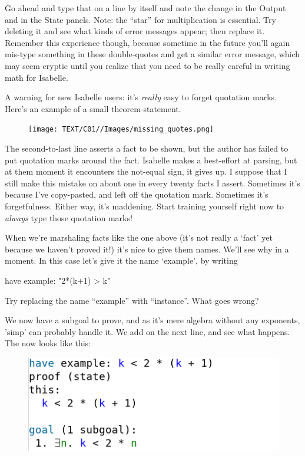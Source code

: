 \task Go ahead and type that on a line by itself and note the change in the Output and in the State panels. Note: the ``star'' for multiplication is essential. Try deleting it and see what kinds of error messages appear; then replace it. Remember this experience though, because sometime in the future you'll again mis-type something in these double-quotes and get a similar error message, which may seem cryptic until you realize that you need to be really careful in writing math for Isabelle.
\etask

A warning for new Isabelle users: it's \textit{really} easy to forget quotation marks. Here's an example of a small theorem-statement. 
\begin{figure}[h]
    \texttt{[image: TEXT/C01//Images/missing\_quotes.png]}
\end{figure}
The second-to-last line asserts a fact to be shown, but the author has failed to put quotation marks around the fact. Isabelle makes a best-effort at parsing, but at them moment it encounters the not-equal sign, it gives up. I suppose that I still make this mistake on about one in every twenty facts I assert. Sometimes it's because I've copy-pasted, and left off the quotation mark. Sometimes it's forgetfulness. Either way, it's maddening. Start training yourself right now to \textit{always} type those quotation marks!

When we're marshaling facts like the one above (it's not really a `fact' yet because we haven't proved it!) it's nice to give them names. We'll see why in a moment. In this case let's give it the name `example', by writing
\begin{IS}
have example: "2*(k+1) > k"    
\end{IS}

\task 
Try replacing the name ``example'' with ``instance''. What goes wrong? 
\etask

We now have a subgoal to prove, and as it's mere algebra without any exponents, 'simp' can probably handle it.  We add  on the next line, and see what happens. The  now looks like this:

\begin{figure}[h]
    \includegraphics[width=0.5\linewidth]{TEXT/C01/Images/proof-state.png}
\end{figure}

